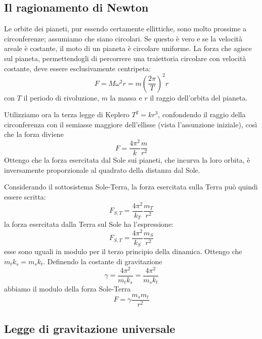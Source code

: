 \documentclass[class=book, crop=false, oneside, 12pt]{standalone}
\begin{document}
\subsection{Il ragionamento di Newton}

Le orbite dei pianeti, pur essendo certamente ellittiche, sono molto prossime a circonferenze; assumiamo che siano circolari.\newline
Se questo è vero e se la velocità areale è costante, il moto di un pianeta è circolare uniforme.
La forza che agisce sul pianeta, permettendogli di percorrere una traiettoria circolare  con velocità costante, deve essere esclusivamente centripeta:
\begin{equation}
    F = M \omega^2 r = m \left(\frac{2 \pi}{T}\right)^2 r
\end{equation}
con \(T\) il periodo di rivoluzione, \(m\) la massa e \(r\) il raggio dell'orbita del pianeta. 

Utilizziamo ora la terza legge di Keplero $T^2 = k r^3$, confondendo il raggio della circonferenza con il semiasse maggiore dell'ellisse (vista l'assunzione iniziale), così che la forza diviene
\begin{equation*}
    F = \frac{4 \pi^2}{k} \frac{m}{r^2}
\end{equation*}
Ottengo che la forza esercitata dal Sole sui pianeti, che incurva la loro orbita, è inversamente proporzionale al quadrato della distanza dal Sole.

Considerando il sottosistema Sole-Terra, la forza esercitata sulla Terra può quindi essere scritta:
\begin{equation*}
    F_{S,T} = \frac{4 \pi^2}{k_T} \frac{m_T}{r^2}
\end{equation*}
la forza esercitata dalla Terra sul Sole ha l'espressione:
\begin{equation*}
    F_{S,T} = \frac{4 \pi^2}{k_S} \frac{m_S}{r^2}
\end{equation*}
esse sono uguali in modulo per il terzo principio della dinamica.
Ottengo che \(m_t k_s = m_s k_t\).
Definendo la costante di gravitazione
\begin{equation}
    \gamma = \frac{4 \pi^2}{m_t k_s} = \frac{4 \pi^2}{m_s k_t}
\end{equation}
abbiamo il modulo della forza Sole-Terra
\begin{equation}
    F = \gamma \frac{m_s m_t}{r^2}
\end{equation}

\subsection{Legge di gravitazione universale}
\end{document}
